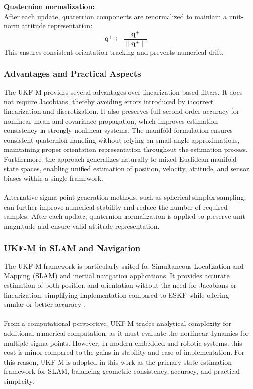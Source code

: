 \textbf{Quaternion normalization:} \\ \noindent
After each update, quaternion components are renormalized to maintain a unit-norm attitude representation:
$$
    \mathbf{q}^+ \leftarrow \frac{\mathbf{q}^+}{\|\mathbf{q}^+\|}.
$$
This ensures consistent orientation tracking and prevents numerical drift.



\subsubsection{Advantages and Practical Aspects}
The UKF-M provides several advantages over linearization-based filters. It does not require Jacobians, thereby avoiding errors introduced by incorrect linearization and discretization. It also preserves full second-order accuracy for nonlinear mean and covariance propagation, which improves estimation consistency in strongly nonlinear systems. The manifold formulation ensures consistent quaternion handling without relying on small-angle approximations, maintaining proper orientation representation throughout the estimation process. Furthermore, the approach generalizes naturally to mixed Euclidean-manifold state spaces, enabling unified estimation of position, velocity, attitude, and sensor biases within a single framework. 
\\ \\
Alternative sigma-point generation methods, such as spherical simplex sampling, can further improve numerical stability and reduce the number of required samples. After each update, quaternion normalization is applied to preserve unit magnitude and ensure valid attitude representation.




\subsubsection{UKF-M in SLAM and Navigation}
The UKF-M framework is particularly suited for Simultaneous Localization and Mapping (SLAM) and inertial navigation applications. It provides accurate estimation of both position and orientation without the need for Jacobians or linearization, simplifying implementation compared to ESKF while offering similar or better accuracy \cite{ukf_manifold}.  
\\ \\
From a computational perspective, UKF-M trades analytical complexity for additional numerical computation, as it must evaluate the nonlinear dynamics for multiple sigma points. However, in modern embedded and robotic systems, this cost is minor compared to the gains in stability and ease of implementation. For this reason, UKF-M is adopted in this work as the primary state estimation framework for SLAM, balancing geometric consistency, accuracy, and practical simplicity.
